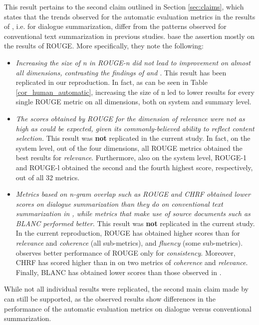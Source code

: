 This result pertains to the second claim outlined in Section \ref{sec:claims}, which states that the trends observed for the automatic evaluation metrics in the results of \citet{gao2022dialsummeval}, i.e. for dialogue summarization, differ from the patterns observed for conventional text summarization in previous studies. \citet{gao2022dialsummeval} base the assertion mostly on the results of ROUGE. More specifically, they note the following:
\begin{itemize}
    \item \textit{Increasing the size of n in ROUGE-n did not lead to improvement on almost all dimensions, contrasting the findings of \citet{rankel-etal-2013-decade} and \citet{fabbri2021convosumm}}. This result has been replicated in our reproduction. In fact, as can be seen in Table \ref{cor_human_automatic}, increasing the size of n led to lower results for every single ROUGE metric on all dimensions, both on system and summary level.
    \item \textit{The scores obtained by ROUGE for the dimension of relevance were not as high as could be expected, given its commonly-believed ability to reflect content selection.} This result was \textbf{not} replicated in the current study. In fact, on the system level, out of the four dimensions, all ROUGE metrics obtained the best results for \textit{relevance}. Furthermore, also on the system level, ROUGE-1 and ROUGE-l obtained the second and the fourth highest score, respectively, out of all 32 metrics.
    \item \textit{Metrics based on n-gram overlap such as ROUGE and CHRF obtained lower scores on dialogue summarization than they do on conventional text summarization in \citet{fabbri2021convosumm}, while metrics that make use of source documents such as BLANC performed better.} This result was \textbf{not} replicated in the current study. In the current reproduction, ROUGE has obtained higher scores than \citet{fabbri2021convosumm} for \textit{relevance} and \textit{coherence} (all sub-metrics), and \textit{fluency} (some sub-metrics). \citet{fabbri2021convosumm} observes better performance of ROUGE only for \textit{consistency}. Moreover, CHRF has scored higher than in \citet{fabbri2021convosumm} on two metrics of \textit{coherence} and \textit{relevance}. Finally, BLANC has obtained lower scores than those observed in \citet{fabbri2021convosumm}.
\end{itemize}

While not all individual results were replicated, the second main claim made by \citet{gao2022dialsummeval} can still be supported, as the observed results show differences in the performance of the automatic evaluation metrics on dialogue versus conventional summarization.



